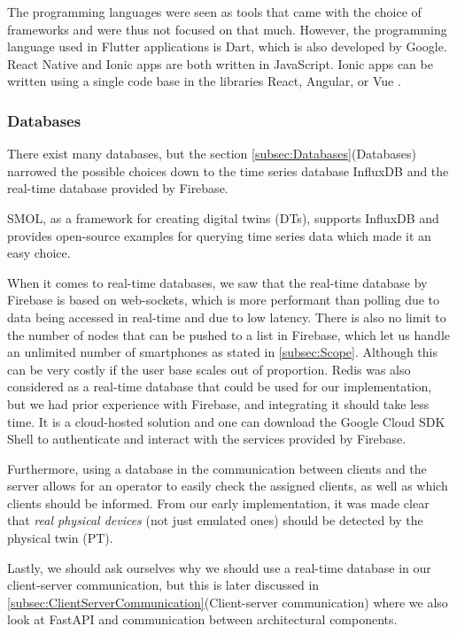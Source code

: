 \documentclass{article}
\begin{document}
The programming languages were seen as tools that came with the choice of frameworks and were thus not focused on that much. However, the programming language used in Flutter applications is Dart, which is also developed by Google. React Native and Ionic apps are both written in JavaScript. Ionic apps can be written using a single code base in the libraries React, Angular, or Vue \cite{noauthor_ionic_nodate}.

\subsubsection{Databases}\label{subsubsection:Databases}
There exist many databases, but the section \ref{subsec:Databases}(Databases) narrowed the possible choices down to the time series database InfluxDB and the real-time database provided by Firebase. 

SMOL, as a framework for creating digital twins (DTs), supports InfluxDB and provides open-source examples for querying time series data which made it an easy choice. 

When it comes to real-time databases, we saw that the real-time database by Firebase is based on web-sockets, which is more performant than polling due to data being accessed in real-time and due to low latency. There is also no limit to the number of nodes that can be pushed to a list in Firebase, which let us handle an unlimited number of smartphones as stated in \ref{subsec:Scope}. Although this can be very costly if the user base scales out of proportion. Redis was also considered as a real-time database that could be used for our implementation, but we had prior experience with Firebase, and integrating it should take less time. It is a cloud-hosted solution \cite{noauthor_firebase_nodate} and one can download the Google Cloud SDK Shell to authenticate and interact with the services provided by Firebase.

Furthermore, using a database in the communication between clients and the server allows for an operator to easily check the assigned clients, as well as which clients should be informed. From our early implementation, it was made clear that \emph{real physical devices} (not just emulated ones) should be detected by the physical twin (PT). 

Lastly, we should ask ourselves why we should use a real-time database in our client-server communication, but this is later discussed in \ref{subsec:ClientServerCommunication}(Client-server communication) where we also look at FastAPI and communication between architectural components.
\end{document}
